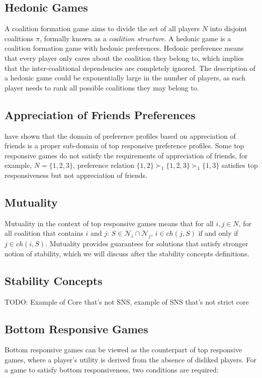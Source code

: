 \subsection{Hedonic Games}
A coalition formation game aims to divide the set of all players $N$ into disjoint coalitions $\pi$, formally known as a {\it coalition structure}. A hedonic game is a coalition formation game with hedonic preferences. 
Hedonic preference means that every player only cares about the coalition they belong to, which implies that the inter-coalitional dependencies are completely ignored. The description of a hedonic game could be exponentially large in the number of players, as each player needs to rank all possible coalitions they may belong to.

\subsection{Appreciation of Friends Preferences}
 have shown that the domain of preference profiles based on appreciation of friends is a proper sub-domain of top responsive preference profiles. Some top responsive games do not satisfy the requirements of appreciation of friends, for example, $N = \{1, 2, 3\}$, preference relation $\{1, 2\} \succ_1 \{1, 2, 3\} \succ_1 \{1, 3\}$ satisfies top responsiveness but not appreciation of friends.

\subsection{Mutuality}
Mutuality in the context of top responsive games means that for all $i, j \in N$, for all coalition that contains $i$ and $j$: $S \in \mathcal{N}_i \cap \mathcal{N}_j$, $i \in ch(j, S)$ if and only if $j \in ch(i, S)$. Mutuality provides guarantees for solutions that satisfy stronger notion of stability, which we will discuss after the stability concepts definitions.

\subsection{Stability Concepts}
TODO: Example of Core that's not SNS, example of SNS that's not strict core

\subsection{Bottom Responsive Games}
Bottom responsive games can be viewed as the counterpart of top responsive games, where a player's utility is derived from the absence of disliked players. For a game to satisfy bottom responsiveness, two conditions are required:

